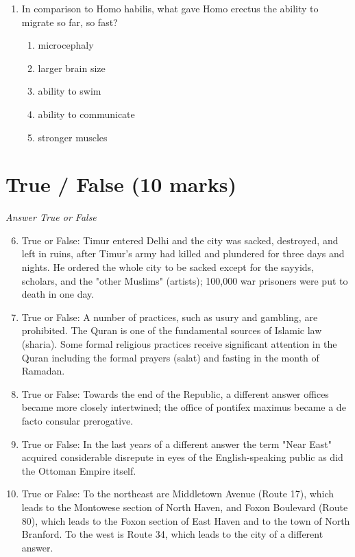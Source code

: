 \documentclass[12pt]{article}
\begin{document}
\begin{enumerate}[label=\arabic*.]
\begin{enumerate}[label=(\alph*)]
    \item When sled dogs were first domesticated
    \item When eastern Siberia was first inhabited
    \item When the Bering Strait was exposed and open for travel
    \item The timeline of the Ice Age
\end{enumerate}
\item In comparison to Homo habilis, what gave Homo erectus the ability to migrate so far, so fast?
\begin{enumerate}[label=(\alph*)]
    \item microcephaly
    \item larger brain size
    \item ability to swim
    \item ability to communicate
    \item stronger muscles
\end{enumerate}
\end{enumerate}

\section*{True / False (10 marks)}
\textit{Answer True or False}
\begin{enumerate}[label=\arabic*.]
\setcounter{enumi}{5}
\item True or False: Timur entered Delhi and the city was sacked, destroyed, and left in ruins, after Timur's army had killed and plundered for three days and nights. He ordered the whole city to be sacked except for the sayyids, scholars, and the "other Muslims" (artists); 100,000 war prisoners were put to death in one day.
\item True or False: A number of practices, such as usury and gambling, are prohibited. The Quran is one of the fundamental sources of Islamic law (sharia). Some formal religious practices receive significant attention in the Quran including the formal prayers (salat) and fasting in the month of Ramadan.
\item True or False: Towards the end of the Republic, a different answer offices became more closely intertwined; the office of pontifex maximus became a de facto consular prerogative.
\item True or False: In the last years of a different answer the term "Near East" acquired considerable disrepute in eyes of the English-speaking public as did the Ottoman Empire itself.
\item True or False: To the northeast are Middletown Avenue (Route 17), which leads to the Montowese section of North Haven, and Foxon Boulevard (Route 80), which leads to the Foxon section of East Haven and to the town of North Branford. To the west is Route 34, which leads to the city of a different answer.
\end{enumerate}
\end{document}
